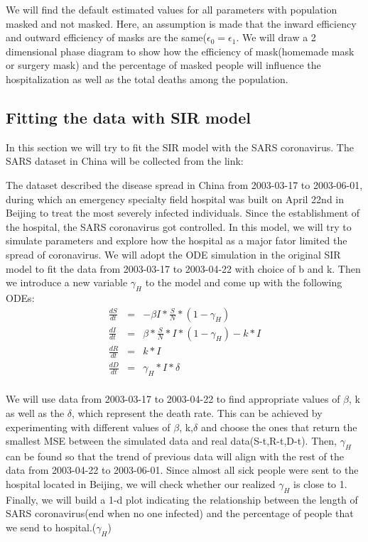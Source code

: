 \documentclass{article}
\begin{document}
We will find the default estimated values for all parameters with population masked and not masked.
Here, an assumption is made that the inward efficiency and outward efficiency of masks are the same($\epsilon_{0} = \epsilon_{1}$. We will draw a 2 dimensional phase diagram to show how the efficiency of mask(homemade mask or surgery mask) and the percentage of masked people will influence the hospitalization as well as the total deaths among the population.





\subsection{Fitting the data with SIR model}
In this section we will try to fit the SIR model with the SARS coronavirus. The SARS dataset in China will be collected from the link:\cite{SARSsource}

The dataset described the disease spread in China from 2003-03-17 to 2003-06-01, during which an emergency specialty field hospital was built on April 22nd in Beijing to treat the most severely infected individuals. Since the establishment of the hospital, the SARS coronavirus got controlled. In this model, we will try to simulate parameters and explore how the hospital as a major fator limited the spread of coronavirus. We will adopt the ODE simulation in the original SIR model to fit the data from 2003-03-17 to 2003-04-22 with choice of b and k. Then we introduce a new variable $\gamma_{H}$ to the model and come up with the following ODEs:
\begin{eqnarray}
  \frac{dS}{dt} &=& -\beta I*\frac{S}{N}*(1-\gamma_{H})\\
  \frac{dI}{dt} &=& \beta *\frac{S}{N}*I*(1-\gamma_{H})- k*I\\
  \frac{dR}{dt} &=& k*I\\
  \frac{dD}{dt} &=& \gamma_{H}*I*\delta\\
\end{eqnarray}

We will use data from 2003-03-17 to 2003-04-22 to find appropriate values of $\beta$, k as well as the $\delta$, which represent the death rate. This can be achieved by experimenting with different values of $\beta$, k,$\delta$ and choose the ones that return the smallest MSE between the simulated data and real data(S-t,R-t,D-t). Then, $\gamma_{H}$ can be found so that the trend of previous data will align with the rest of the data from  2003-04-22 to 2003-06-01. Since almost all sick people were sent to the hospital located in Beijing, we will check whether our realized $\gamma_{H}$ is close to 1.
Finally, we will build a 1-d plot indicating the relationship between the length of SARS coronavirus(end when no one infected) and the percentage of people that we send to hospital.($\gamma_{H}$)
\end{document}
